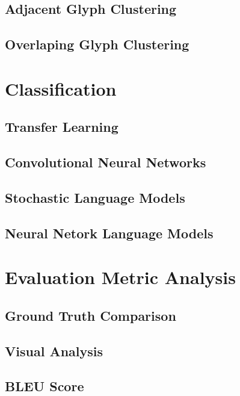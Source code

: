 \subsection{Adjacent Glyph Clustering}

\subsection{Overlaping Glyph Clustering}

\section{Classification}

\subsection{Transfer Learning}

\subsection{Convolutional Neural Networks}

\subsection{Stochastic Language Models}

\subsection{Neural Netork Language Models}


\section{Evaluation Metric Analysis}

\subsection{Ground Truth Comparison}

\subsection{Visual Analysis}

\subsection{BLEU Score}
\cite{Callison-Burch}

